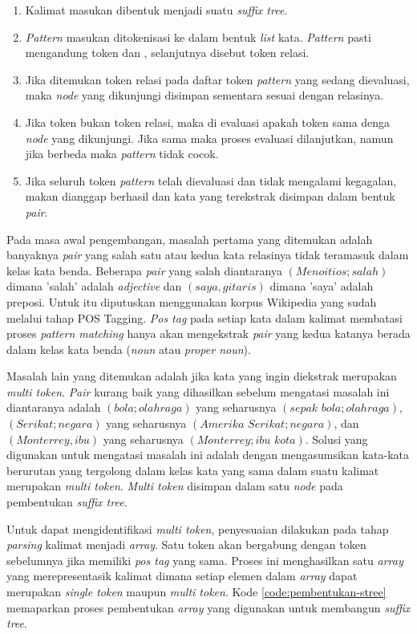 \begin{enumerate}
  \item Kalimat masukan dibentuk menjadi suatu \textit{suffix tree}.
  \item \textit{Pattern} masukan ditokenisasi ke dalam bentuk \textit{list} 
  kata. \textit{Pattern} pasti mengandung token {\tagHypernym} dan {\tagHyponym}, selanjutnya disebut token relasi.
  \item Jika ditemukan token relasi pada daftar token \textit{pattern} yang sedang dievaluasi, maka \textit{node} yang dikunjungi disimpan sementara sesuai dengan relasinya.
  \item Jika token bukan token relasi, maka di evaluasi apakah token sama denga  \textit{node} yang dikunjungi. Jika sama maka proses evaluasi dilanjutkan, namun jika berbeda maka \textit{pattern} tidak cocok.
  \item Jika seluruh token \textit{pattern} telah dievaluasi dan tidak mengalami kegagalan, makan dianggap berhasil dan kata yang terekstrak disimpan dalam bentuk \textit{pair}.
\end{enumerate}

Pada masa awal pengembangan, masalah pertama yang ditemukan adalah banyaknya \textit{pair} yang salah satu atau kedua kata relasinya tidak teramasuk dalam kelas kata benda. Beberapa \textit{pair} yang salah diantaranya $(Menoitios;salah)$ dimana 'salah' adalah \textit{adjective} dan $(saya,gitaris)$ dimana 'saya' adalah preposi. Untuk itu diputuskan menggunakan korpus Wikipedia yang sudah melalui tahap POS Tagging. \textit{Pos tag} pada setiap kata dalam kalimat membatasi proses \textit{pattern matching} hanya akan mengekstrak \textit{pair} yang kedua katanya berada dalam kelas kata benda (\textit{noun} atau \textit{proper noun}). 

Masalah lain yang ditemukan adalah jika kata yang ingin diekstrak merupakan \textit{multi token}. \textit{Pair} kurang baik yang dihasilkan sebelum mengatasi masalah ini diantaranya adalah $(bola;olahraga)$ yang seharusnya $(sepak\,\,bola;olahraga)$, $(Serikat;negara)$ yang seharusnya $(Amerika\,\,Serikat;negara)$, dan $(Monterrey,ibu)$ yang seharusnya $(Monterrey;ibu\,\,kota)$. Solusi yang digunakan untuk mengatasi masalah ini adalah dengan mengasumsikan kata-kata berurutan yang tergolong dalam kelas kata yang sama dalam suatu kalimat merupakan \textit{multi token}. \textit{Multi token} disimpan dalam satu \textit{node} pada pembentukan \textit{suffix tree}.

Untuk dapat mengidentifikasi \textit{multi token}, penyesuaian dilakukan pada tahap \textit{parsing} kalimat menjadi \textit{array}. Satu token akan bergabung dengan token sebelumnya jika memiliki \textit{pos tag} yang sama. Proses ini menghasilkan satu \textit{array} yang merepresentasik kalimat dimana setiap elemen dalam \textit{array} dapat merupakan \textit{single token} maupun \textit{multi token}. Kode \ref{code:pembentukan-stree} memaparkan proses pembentukan \textit{array} yang digunakan untuk membangun \textit{suffix tree}.

